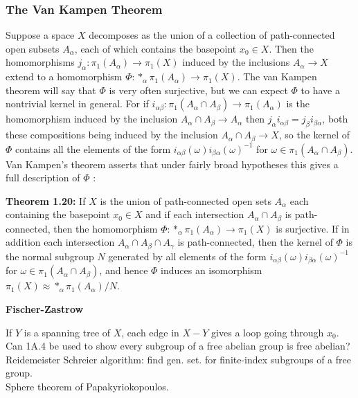 \documentclass[a4paper]{article}
\begin{document}
\subsubsection*{The Van Kampen Theorem}
Suppose a space $X$ decomposes as the union of a collection of path-connected
open subsets $A_{\alpha}$, each of which contains the basepoint $x_0 \in X$.
Then the homomorphisms $j_{\alpha}  \colon \pi_1 \left( A_{\alpha} \right) 
\to \pi_1 \left( X \right) $ induced by the inclusions
$A_{\alpha} \to X$ extend to a homomorphism $\Phi  \colon 
*_{\alpha} \pi_1 \left( A_{\alpha} \right) \to \pi_1 (X)$. 
The van Kampen theorem will say that $\Phi$ is very often surjective, but we
can expect $\Phi$ to have a nontrivial kernel in general. For if
$i_{\alpha \beta}  \colon \pi_1 \left( A_{\alpha} \cap A_{\beta} \right) 
\to \pi_1 \left( A_{\alpha} \right) $ is the homomorphism induced by the
inclusion
$A_{\alpha} \cap A_{\beta} \to A_{\alpha}$ then
$j_{\alpha} i_{\alpha \beta} = j_{\beta} i_{\beta \alpha}$, both these
compositions being induced by the inclusion $A_{\alpha} \cap A_{\beta} \to X$,
so the kernel of $\Phi$ contains all the elements of the form
$i_{\alpha \beta}(\omega) i_{\beta \alpha} \left( \omega \right)^{-1}$ for
$\omega \in \pi_1 \left( A_{\alpha} \cap A_{\beta} \right) $. Van Kampen's
theorem asserts that under fairly broad hypotheses this gives a full
description of
$\Phi$ :\\
\linebreak

\textbf{Theorem 1.20:} If $X$ is the union of path-connected open sets
$A_{\alpha}$ each containing the basepoint $x_0 \in X$ and if each intersection
$A_{\alpha} \cap A_{\beta}$ is path-connected, then the
homomorphism $\Phi  \colon *_{\alpha}\pi_1 \left( A_{\alpha} \right) 
\to \pi_1 \left( X \right) $ is surjective. If in addition each intersection
$A_{\alpha} \cap A_{\beta} \cap A_{\gamma}$ is path-connected, then the kernel
of $\Phi$ is the normal subgroup $N$ generated by all elements of the form
$i_{\alpha \beta} (\omega) i_{\beta \alpha}\left( \omega \right)^{-1}$ for
$\omega \in \pi_1 \left( A_{\alpha} \cap A_{\beta} \right) $, and
hence $\Phi$ induces an isomorphism $\pi_1 \left( X \right) \approx
*_{\alpha} \pi_1 \left( A_{\alpha} \right) / N$.





\textbf{Fischer-Zastrow}


\newpage

If $Y$ is a spanning tree of $X$, each edge in
$X - Y$ gives a loop going through $x_0$.\\
\linebreak
Can 1A.4 be used to show every subgroup of a free abelian group
is free abelian?\\

\linebreak
Reidemeister Schreier algorithm: find gen. set. for finite-index
subgroups of a free group.\\
\linebreak
Sphere theorem of Papakyriokopoulos. 
\end{document}
